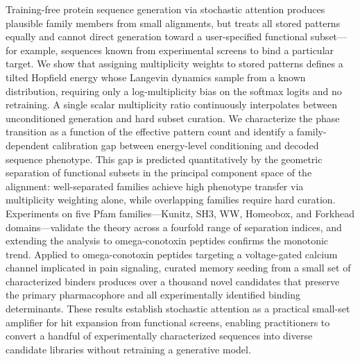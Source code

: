 Training-free protein sequence generation via stochastic attention produces plausible family
members from small alignments, but treats all stored patterns equally and cannot direct generation
toward a user-specified functional subset---for example, sequences known from experimental screens
to bind a particular target. We show that assigning multiplicity weights to stored patterns
defines a tilted Hopfield energy whose Langevin dynamics sample from a known distribution,
requiring only a log-multiplicity bias on the softmax logits and no retraining. A single scalar
multiplicity ratio continuously interpolates between unconditioned generation and hard subset
curation. We characterize the phase transition as a function of the effective pattern count and
identify a family-dependent calibration gap between energy-level conditioning and decoded sequence
phenotype. This gap is predicted quantitatively by the geometric separation of functional subsets
in the principal component space of the alignment: well-separated families achieve high
phenotype transfer via multiplicity weighting alone, while overlapping families require hard
curation. Experiments on five Pfam families---Kunitz, SH3, WW, Homeobox, and Forkhead
domains---validate the theory across a fourfold range of separation indices, and extending
the analysis to omega-conotoxin peptides confirms the monotonic trend. Applied to
omega-conotoxin peptides targeting a voltage-gated calcium channel implicated in pain
signaling, curated memory seeding from a small set of characterized binders produces over a
thousand novel candidates that preserve the primary pharmacophore and all experimentally
identified binding determinants. These results establish stochastic attention as a practical
small-set amplifier for hit expansion from functional screens, enabling practitioners to convert
a handful of experimentally characterized sequences into diverse candidate libraries without
retraining a generative model.
